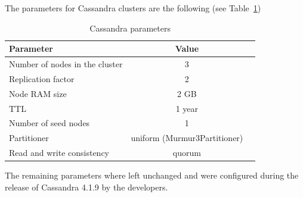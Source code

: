 The parameters for Cassandra clusters are the following (see
Table~\ref{tab:params})

\begin{table}[htp!]
  \caption{Cassandra parameters}
  \label{tab:params}
  \centering
  \begin{tabular}{lcc}
    \hline
    {\bf Parameter}                                  & {\bf Value } \\
    \hline
    Number of nodes in the cluster                   & 3       \\
    Replication factor                               & 2       \\
    Node RAM size                                    & 2 GB    \\
    TTL                                              & 1 year  \\
    Number of seed nodes                             & 1       \\
    Partitioner                                      & uniform (Murmur3Partitioner) \\
    Read and write consistency                       & quorum  \\
  \end{tabular}
\end{table}

The remaining parameters where left unchanged and were configured
during the release of Cassandra 4.1.9 by the developers.
